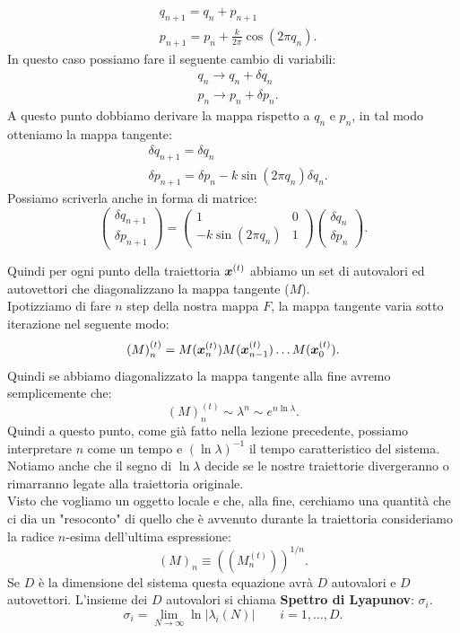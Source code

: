 \begin{exmp}
    \[\begin{aligned}
	&q_{n+1} = q_n + p_{n+1}\\
	&p_{n+1} = p_n + \frac{k}{2\pi}\cos ( 2\pi  q_n)
    .\end{aligned}\]
    In questo caso possiamo fare il seguente cambio di variabili:
    \[\begin{aligned}
	& q_n \to q_n + \delta q_n\\
	& p_n \to p_n + \delta p_n
    .\end{aligned}\]
    A questo punto dobbiamo derivare la mappa rispetto a $q_n$ e $p_n$, in tal modo otteniamo la mappa tangente:
    \[\begin{aligned}
	& \delta q_{n+1} = \delta q_n \\
	& \delta p_{n+1} = \delta p_n - k \sin (2\pi q_n)\delta q_n
    .\end{aligned}\]
    Possiamo scriverla anche in forma di matrice:
    \[
        \begin{pmatrix} \delta q_{n+1} \\ \delta p_{n+1} \end{pmatrix} =
	\begin{pmatrix} 
	    1 & 0 \\
	    -k \sin (2\pi q_n) & 1
	\end{pmatrix} 
	\begin{pmatrix} \delta q_n \\ \delta p_n \end{pmatrix} 
    .\] 
\end{exmp}
\noindent
Quindi per ogni punto della traiettoria $\boldsymbol{x}^{(t)}$ abbiamo un set di autovalori ed autovettori che diagonalizzano la mappa tangente ($M$).\\
Ipotizziamo di fare $n$ step della nostra mappa $F$, la mappa tangente varia sotto iterazione nel seguente modo:
\[
    \left(M\right)^{(t)}_n = M(\boldsymbol{x}^{(t)}_n)M(\boldsymbol{x}^{(t)}_{n-1})\ldots M(\boldsymbol{x}^{(t)}_0)
.\] 
Quindi se abbiamo diagonalizzato la mappa tangente alla fine avremo semplicemente che:
\[
    \left(M\right)^{(t)}_n \sim \lambda^n \sim e^{n\ln\lambda}
.\] 
Quindi a questo punto, come già fatto nella lezione precedente, possiamo interpretare $n$ come un tempo e $(\ln\lambda)^{-1}$ il tempo caratteristico del sistema.\\
Notiamo anche che il segno di $\ln\lambda$ decide se le nostre traiettorie divergeranno o rimarranno legate alla traiettoria originale.\\
Visto che vogliamo un oggetto locale e che, alla fine, cerchiamo una quantità che ci dia un "resoconto" di quello che è avvenuto durante la traiettoria consideriamo la radice $n$-esima dell'ultima espressione:
\[
    (M)_n \equiv \left((M^{(t)}_n)\right)^{1/n}
.\] 
Se $D$ è la dimensione del sistema questa equazione avrà $D$ autovalori e $D$ autovettori. L'insieme dei $D$ autovalori si chiama \textbf{Spettro di Lyapunov}: $\sigma_i$.
\[
    \sigma_i = \lim_{N \to \infty} \ln\left|\lambda_i(N)\right| \qquad i = 1, \ldots, D
.\] 
